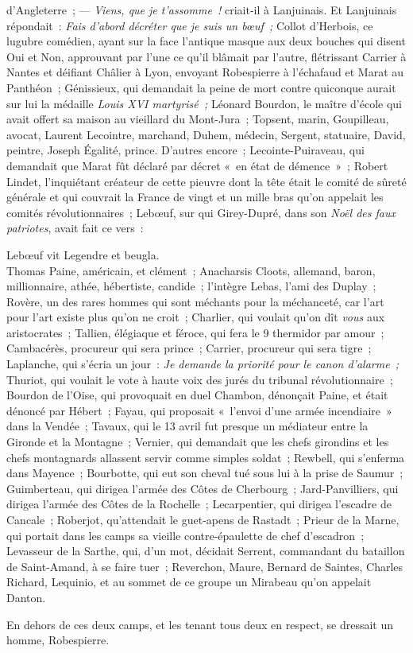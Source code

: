 \documentclass[french,twoside]{book} %
\begin{document}
d’Angleterre ; — \emph{Viens, que je t’assomme !} criait-il à Lanjuinais. Et Lanjuinais répondait : \emph{Fais d’abord décréter que je suis un bœuf ;} Collot d’Herbois, ce lugubre comédien, ayant sur la face l’antique masque aux deux bouches qui disent Oui et Non, approuvant par l’une ce qu’il blâmait par l’autre, flétrissant Carrier à Nantes et déifiant Châlier à Lyon, envoyant Robespierre à l’échafaud et Marat au Panthéon ; Génissieux, qui demandait la peine de mort contre quiconque aurait sur lui la médaille \emph{Louis XVI martyrisé ;} Léonard Bourdon, le maître d’école qui avait offert sa maison au vieillard du Mont-Jura ; Topsent, marin, Goupilleau, avocat, Laurent Lecointre, marchand, Duhem, médecin, Sergent, statuaire, David, peintre, Joseph Égalité, prince. D’autres encore ;  Lecointe-Puiraveau, qui demandait que Marat fût déclaré par décret « en état de démence » ; Robert Lindet, l’inquiétant créateur de cette pieuvre dont la tête était le comité de sûreté générale et qui couvrait la France de vingt et un mille bras qu’on appelait les comités révolutionnaires ; Lebœuf, sur qui Girey-Dupré, dans son \emph{Noël des faux patriotes}, avait fait ce vers :\par

Lebœuf vit Legendre et beugla.\\

\noindent Thomas Paine, américain, et clément ; Anacharsis Cloots, allemand, baron, millionnaire, athée, hébertiste, candide ; l’intègre Lebas, l’ami des Duplay ; Rovère, un des rares hommes qui sont méchants pour la méchanceté, car l’art pour l’art existe plus qu’on ne croit ; Charlier, qui voulait qu’on dît \emph{vous} aux aristocrates ; Tallien, élégiaque et féroce, qui fera le 9 thermidor par amour ; Cambacérès, procureur qui sera prince ; Carrier, procureur qui sera tigre ; Laplanche, qui s’écria un jour : \emph{Je demande la priorité pour le canon d’alarme ;} Thuriot, qui voulait le vote à haute voix des jurés du tribunal révolutionnaire ; Bourdon de l’Oise, qui provoquait en duel Chambon, dénonçait Paine, et était dénoncé par Hébert ; Fayau, qui proposait « l’envoi d’une armée incendiaire » dans la Vendée ; Tavaux, qui le 13 avril fut presque un médiateur entre la Gironde et la Montagne ; Vernier, qui demandait que les chefs girondins et les chefs montagnards allassent servir comme simples soldat ; Rewbell, qui s’enferma dans Mayence ; Bourbotte, qui  eut son cheval tué sous lui à la prise de Saumur ; Guimberteau, qui dirigea l’armée des Côtes de Cherbourg ; Jard-Panvilliers, qui dirigea l’armée des Côtes de la Rochelle ; Lecarpentier, qui dirigea l’escadre de Cancale ; Roberjot, qu’attendait le guet-apens de Rastadt ; Prieur de la Marne, qui portait dans les camps sa vieille contre-épaulette de chef d’escadron ; Levasseur de la Sarthe, qui, d’un mot, décidait Serrent, commandant du bataillon de Saint-Amand, à se faire tuer ; Reverchon, Maure, Bernard de Saintes, Charles Richard, Lequinio, et au sommet de ce groupe un Mirabeau qu’on appelait Danton.\par
En dehors de ces deux camps, et les tenant tous deux en respect, se dressait un homme, Robespierre.\par
\end{document}

